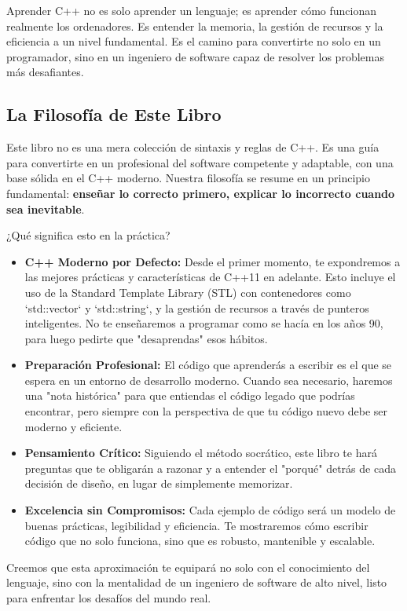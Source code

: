 Aprender C++ no es solo aprender un lenguaje; es aprender cómo funcionan realmente los ordenadores. Es entender la memoria, la gestión de recursos y la eficiencia a un nivel fundamental. Es el camino para convertirte no solo en un programador, sino en un ingeniero de software capaz de resolver los problemas más desafiantes.

\subsection{La Filosofía de Este Libro}
\label{sec:filosofia}

Este libro no es una mera colección de sintaxis y reglas de C++. Es una guía para convertirte en un profesional del software competente y adaptable, con una base sólida en el C++ moderno. Nuestra filosofía se resume en un principio fundamental: \textbf{enseñar lo correcto primero, explicar lo incorrecto cuando sea inevitable}.

¿Qué significa esto en la práctica?
\begin{itemize}
    \item \textbf{C++ Moderno por Defecto:} Desde el primer momento, te expondremos a las mejores prácticas y características de C++11 en adelante. Esto incluye el uso de la Standard Template Library (STL) con contenedores como `std::vector` y `std::string`, y la gestión de recursos a través de punteros inteligentes. No te enseñaremos a programar como se hacía en los años 90, para luego pedirte que "desaprendas" esos hábitos.
    \item \textbf{Preparación Profesional:} El código que aprenderás a escribir es el que se espera en un entorno de desarrollo moderno. Cuando sea necesario, haremos una "nota histórica" para que entiendas el código legado que podrías encontrar, pero siempre con la perspectiva de que tu código nuevo debe ser moderno y eficiente.
    \item \textbf{Pensamiento Crítico:} Siguiendo el método socrático, este libro te hará preguntas que te obligarán a razonar y a entender el "porqué" detrás de cada decisión de diseño, en lugar de simplemente memorizar.
    \item \textbf{Excelencia sin Compromisos:} Cada ejemplo de código será un modelo de buenas prácticas, legibilidad y eficiencia. Te mostraremos cómo escribir código que no solo funciona, sino que es robusto, mantenible y escalable.
\end{itemize}

Creemos que esta aproximación te equipará no solo con el conocimiento del lenguaje, sino con la mentalidad de un ingeniero de software de alto nivel, listo para enfrentar los desafíos del mundo real.


